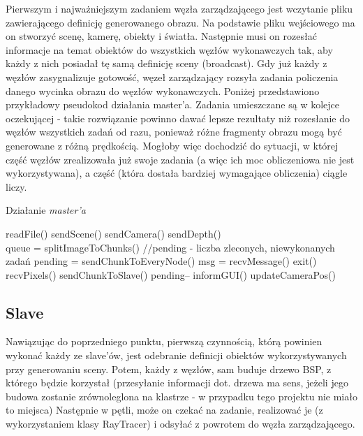 Pierwszym i najważniejszym zadaniem węzła zarządzającego jest wczytanie pliku zawierającego definicję generowanego obrazu. Na podstawie pliku wejściowego ma on stworzyć scenę, kamerę, obiekty i światła. Następnie musi on rozesłać informacje na temat obiektów do wszystkich węzłów wykonawczych tak, aby każdy z nich posiadał tę samą definicję sceny (broadcast). Gdy już każdy z węzłów zasygnalizuje gotowość, węzeł zarządzający rozsyła zadania policzenia danego wycinka obrazu do węzłów wykonawczych. Poniżej przedstawiono przykładowy pseudokod działania master'a. Zadania umieszczane są w kolejce oczekującej - takie rozwiązanie powinno dawać lepsze rezultaty niż rozesłanie do węzłów wszystkich zadań od razu, ponieważ różne fragmenty obrazu mogą być generowane z różną prędkością. Mogłoby więc dochodzić do sytuacji, w której część węzłów zrealizowała już swoje zadania (a więc ich moc obliczeniowa nie jest wykorzystywana), a część (która dostała bardziej wymagające obliczenia) ciągle liczy.

\begin{algorithm}[H]
\caption{Działanie \emph{master'a}}
\begin{algorithmic}
\State readFile()
\State sendScene()
\State sendCamera()
\State sendDepth()
\\
\State queue = splitImageToChunks()
\State //pending - liczba zleconych, niewykonanych zadań
\State pending = sendChunkToEveryNode()
\State msg = recvMessage()
 exit()
	recvPixels()
		sendChunkToSlave()
	\Else
		pending--
	\EndIf
\EndIf
\EndWhile
\State informGUI()
\State updateCameraPos()
\EndWhile
\end{algorithmic}
\end{algorithm}

\subsection{Slave}

Nawiązując do poprzedniego punktu, pierwszą czynnością, którą powinien wykonać każdy ze slave'ów, jest odebranie definicji obiektów wykorzystywanych przy generowaniu sceny. Potem, każdy z węzłów, sam buduje drzewo BSP, z którego będzie korzystał (przesyłanie informacji dot. drzewa ma sens, jeżeli jego budowa zostanie zrównoleglona na klastrze - w przypadku tego projektu nie miało to miejsca) Następnie w pętli, może on czekać na zadanie, realizować je (z wykorzystaniem klasy RayTracer) i odsyłać z powrotem do węzła zarządzającego.

